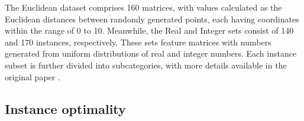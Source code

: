 \documentclass[preprint,12pt]{elsarticle}
\begin{document}
The Euclidean dataset comprises 160 matrices, with values calculated as the Euclidean distances between randomly generated points, each having coordinates within the range of 0 to 10. Meanwhile, the Real and Integer sets consist of 140 and 170 instances, respectively. These sets feature matrices with numbers generated from uniform distributions of real and integer numbers. Each instance subset is further divided into subcategories, with more details available in the original paper \cite{marti2021mdplib}.
\subsection{Instance optimality}



 






\end{document}
